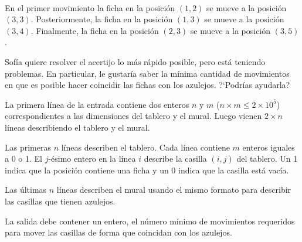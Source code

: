 \documentclass{oci}
\def\nrows{3}
\def\ncols{5}
\newcommand{\drawnumbers}{
  \foreach \col in {1, ..., \ncols} {
    \node at (\col - 0.5, 3.35) {\col};
  }
  \foreach \row in {1, ..., \nrows} {
    \node at (-0.35, \nrows - \row + 0.5) {\row};
  }
}
\begin{document}
\begin{problemDescription}
\begin{center}
  ~
\end{center}
En el primer movimiento la ficha en la posición $(1, 2)$ se mueve a la
posición $(3, 3)$.
%
Posteriormente, la ficha en la posición $(1, 3)$ se mueve a la posición
$(3, 4)$.
%
Finalmente, la ficha en la posición $(2, 3)$ se mueve a la posición  $(3, 5)$.

Sofía quiere resolver el acertijo lo más rápido posible, pero está
teniendo problemas.
En particular, le gustaría saber la mínima cantidad de movimientos
en que es posible hacer coincidir las fichas con los azulejos.
?`Podrías ayudarla?

\end{problemDescription}

\begin{inputDescription}
  La primera línea de la entrada contiene dos enteros $n$ y $m$ ($n \times m \leq 2 \times 10^5$)
  correspondientes a las dimensiones del tablero y el mural.
  Luego vienen $2 \times n$ líneas describiendo el tablero y el mural.

  Las primeras $n$ líneas describen el tablero.
  Cada línea contiene $m$ enteros iguales a 0 o 1.
  El $j$-ésimo entero en la línea $i$ describe la casilla $(i, j)$ del tablero.
  Un 1 indica que la posición contiene una ficha y un 0 indica que la casilla
  está vacía.

  Las últimas $n$ líneas describen el mural usando el mismo formato para describir
  las casillas que tienen azulejos.
\end{inputDescription}

\begin{outputDescription}
La salida debe contener un entero, el número mínimo de movimientos
requeridos para mover las casillas de forma que coincidan con
los azulejos.
\end{outputDescription}
\end{document}
